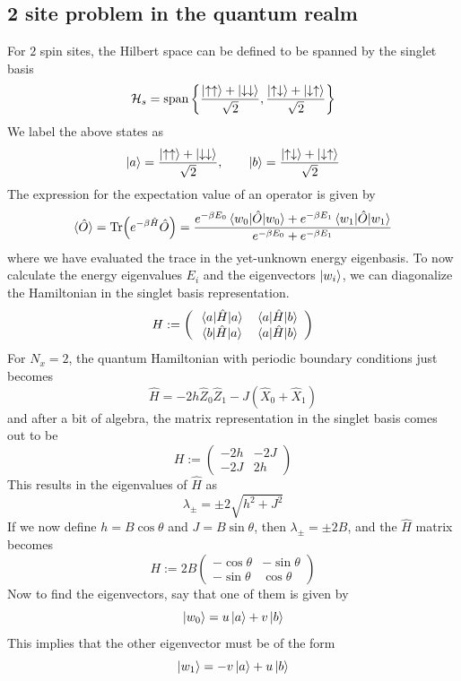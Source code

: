 \documentclass[../journal_main.tex]{subfiles}
\begin{document}
\subsection{2 site problem in the quantum realm}
For $2$ spin sites, the Hilbert space can be defined to be spanned by the singlet basis
\[
    \mathcal{H}_s = \text{span} \left\{\frac{\ket{\uparrow \uparrow} + \ket{\downarrow\downarrow}}{\sqrt{2}}, \frac{\ket{\uparrow\downarrow} + \ket{\downarrow\uparrow}}{\sqrt{2}} \right\}
\]   
We label the above states as 
\[ \ket{a} = \frac{\ket{\uparrow \uparrow} + \ket{\downarrow\downarrow}}{\sqrt{2}}, \qquad \ket{b} = \frac{\ket{\uparrow\downarrow} + \ket{\downarrow\uparrow}}{\sqrt{2}}\]
The expression for the expectation value of an operator is given by 
\[
    \langle{\hat{O}}\rangle = \Tr(e^{-\beta \hat{H}} \hat{O}) = \frac{e^{-\beta E_0}\mel{w_0}{\hat{O}}{w_0} + e^{-\beta E_1}\mel{w_1}{\hat{O}}{w_1}}{e^{-\beta  E_0} + e^{-\beta E_1}}
\]
where we have evaluated the trace in the yet-unknown energy eigenbasis. To now calculate the energy eigenvalues $E_i$ and the eigenvectors $\ket{w_i}$, we can diagonalize the Hamiltonian in the singlet basis representation.
\[
    H := \left(\begin{array}{cc}
    \mel{a}{\hat{H}}{a} & \mel{a}{\hat{H}}{b} \\ 
    \mel{b}{\hat{H}}{a} & \mel{a}{\hat{H}}{b}
    \end{array}\right)
\]  
For $N_x = 2$, the quantum Hamiltonian with periodic boundary conditions just becomes
\[
    \hat{H} = - 2h \hat{Z}_0 \hat{Z}_1 - J(\hat{X}_0 + \hat{X}_1)
\] 
and after a bit of algebra, the matrix representation in the singlet basis comes out to be
\[
    H:= \left(\begin{array}{cc}
    -2h & -2J \\ 
    -2J & 2h
    \end{array}\right)
\]
This results in the eigenvalues of $\hat{H}$ as 
\[
    \lambda_\pm = \pm 2 \sqrt{h^2 + J^2}
\]
If we now define $\boxed{h = B \cos \theta}$ and $\boxed{J = B \sin \theta}$, then $\lambda_\pm = \pm 2B$, and the $\hat{H}$ matrix becomes
\[
    H := 2B \left(\begin{array}{cc}
    -\cos \theta  & -\sin \theta  \\ 
    -\sin \theta  & \cos \theta 
    \end{array}\right)
\]   
Now to find the eigenvectors, say that one of them is given by 
\[
    \ket{w_0} = u \ket{a} + v \ket{b}
\] 
This implies that the other eigenvector must be of the form
\[
    \ket{w_1} = -v \ket{a} + u \ket{b}
\]
\end{document}
